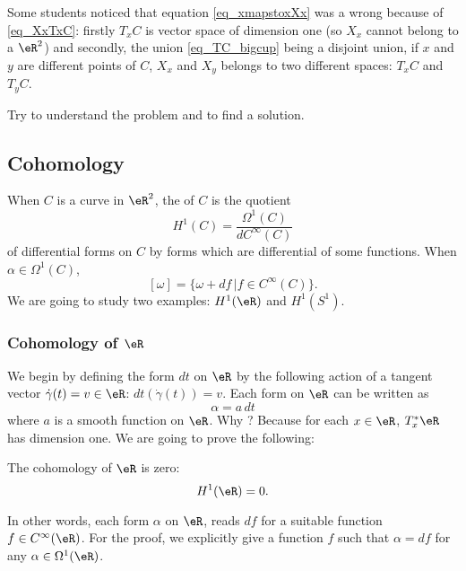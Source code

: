 \begin{exercice}
Some students noticed that equation \eqref{eq_xmapstoxXx} was a wrong because of \eqref{eq_XxTxC}: firstly $T_xC$ is vector space of dimension one (so $X_x$ cannot belong to a $\eR^2$) and secondly, the union \eqref{eq_TC_bigcup} being a disjoint union, if $x$ and $y$ are different points of $C$, $X_x$ and $X_y$ belongs to two different spaces: $T_xC$ and $T_yC$.

Try to understand the problem and to find a solution.
\end{exercice}

%
   \subsection{Cohomology}
%

When $C$ is a curve in $\eR^2$, the  of $C$ is the quotient 
\[ 
  H^1(C)=\frac{ \Omega^1(C) }{ d C^{\infty}(C) }
\]
of differential forms on $C$ by forms which are differential of some functions. When $\alpha\in\Omega^1(C)$, 
\[ 
  [\omega]=\{ \omega+df\,| f\in C^{\infty}(C) \}.
\]
We are going to study two examples: $H^1(\eR)$ and $H^1(S^1)$.


\subsubsection{Cohomology of $\eR$}

We begin by defining the form $dt$ on $\eR$ by the following action of a tangent vector $\dot\gamma(t)=v\in\eR$: $dt(\dot\gamma(t))=v$. Each form on $\eR$ can be written as
\[ 
  \alpha=a\,dt
\]
where $a$ is a smooth function on $\eR$. Why ? Because for each $x\in\eR$, $T^*_x\eR$ has dimension one. We are going to prove the following:

\begin{theorem}
   The cohomology of $\eR$ is zero:
\[ 
  H^1(\eR)=0.
\]
\end{theorem}

In other words, each form $\alpha$ on $\eR$, reads $df$ for a suitable function $f\in C^{\infty}(\eR)$. For the proof, we explicitly give a function $f$ such that $\alpha=df$ for any $\alpha\in\Omega^1(\eR)$. 

